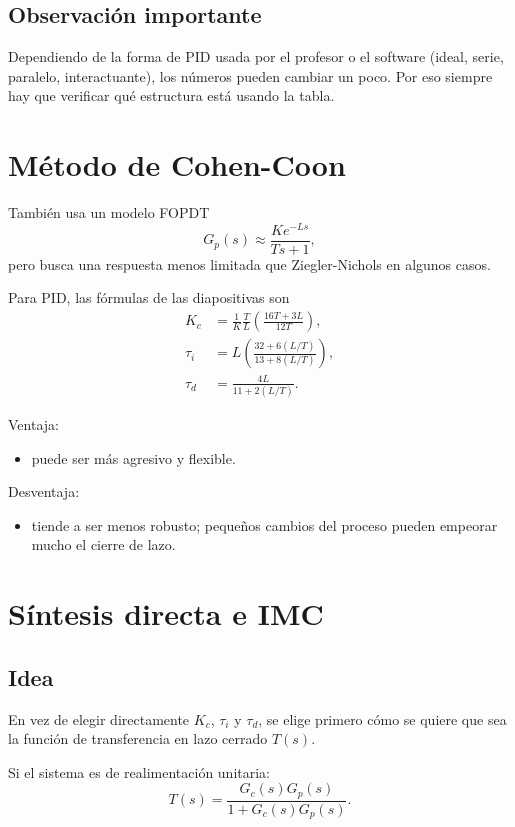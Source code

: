 \documentclass[11pt]{article}
\begin{document}
\subsection{Observaci\'on importante}
Dependiendo de la forma de PID usada por el profesor o el software (ideal, serie, paralelo, interactuante), los n\'umeros pueden cambiar un poco. Por eso siempre hay que verificar qu\'e estructura est\'a usando la tabla.

\section{M\'etodo de Cohen-Coon}
Tambi\'en usa un modelo FOPDT
\[
G_p(s)\approx \frac{Ke^{-Ls}}{Ts+1},
\]
pero busca una respuesta menos limitada que Ziegler-Nichols en algunos casos.

Para PID, las f\'ormulas de las diapositivas son
\begin{align}
K_c &= \frac{1}{K}\frac{T}{L}\left(\frac{16T+3L}{12T}\right),\\
\tau_i &= L\left(\frac{32+6(L/T)}{13+8(L/T)}\right),\\
\tau_d &= \frac{4L}{11+2(L/T)}.
\end{align}

Ventaja:
\begin{itemize}
\item puede ser m\'as agresivo y flexible.
\end{itemize}

Desventaja:
\begin{itemize}
\item tiende a ser menos robusto; peque\~nos cambios del proceso pueden empeorar mucho el cierre de lazo.
\end{itemize}

\section{S\'intesis directa e IMC}
\subsection{Idea}
En vez de elegir directamente $K_c$, $\tau_i$ y $\tau_d$, se elige primero c\'omo se quiere que sea la funci\'on de transferencia en lazo cerrado $T(s)$.

Si el sistema es de realimentaci\'on unitaria:
\begin{equation}
T(s)=\frac{G_c(s)G_p(s)}{1+G_c(s)G_p(s)}.
\end{equation}
\end{document}
